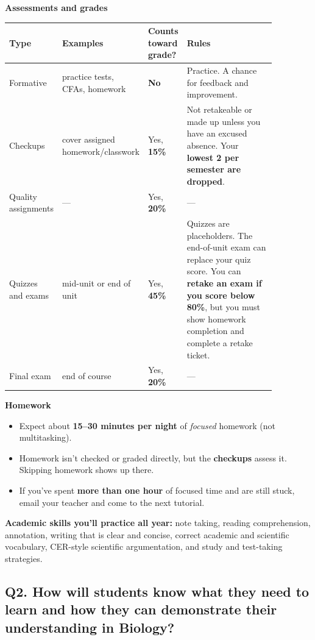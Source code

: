 \documentclass[11pt,letterpaper]{article}
\begin{document}
\textbf{Assessments and grades}

\begin{longtable}{@{}>{\raggedright\arraybackslash}p{0.14\linewidth}>{\raggedright\arraybackslash}p{0.22\linewidth}>{\raggedright\arraybackslash}p{0.14\linewidth}>{\raggedright\arraybackslash}p{0.37\linewidth}@{}}
\toprule
Type & Examples & Counts toward grade? & Rules \\
\midrule
\endhead
Formative & practice tests, CFAs, homework & \textbf{No} & Practice. A chance for feedback and improvement. \\
Checkups & cover assigned homework/classwork & Yes, \textbf{15\%} & Not retakeable or made up unless you have an excused absence. Your \textbf{lowest 2 per semester are dropped}. \\
Quality assignments & — & Yes, \textbf{20\%} & — \\
Quizzes and exams & mid-unit or end of unit & Yes, \textbf{45\%} & Quizzes are placeholders. The end-of-unit exam can replace your quiz score. You can \textbf{retake an exam if you score below 80\%}, but you must show homework completion and complete a retake ticket. \\
Final exam & end of course & Yes, \textbf{20\%} & — \\
\bottomrule
\end{longtable}


\textbf{Homework}
\begin{itemize}
  \item Expect about \textbf{15–30 minutes per night} of \emph{focused} homework (not multitasking).
  \item Homework isn't checked or graded directly, but the \textbf{checkups} assess it. Skipping homework shows up there.
  \item If you've spent \textbf{more than one hour} of focused time and are still stuck, email your teacher and come to the next tutorial.
\end{itemize}

\textbf{Academic skills you'll practice all year:} note taking, reading comprehension, annotation, writing that is clear and concise, correct academic and scientific vocabulary, CER-style scientific argumentation, and study and test-taking strategies.

\subsection{Q2. How will students know what they need to learn and how they can demonstrate their understanding in Biology?}
\end{document}
